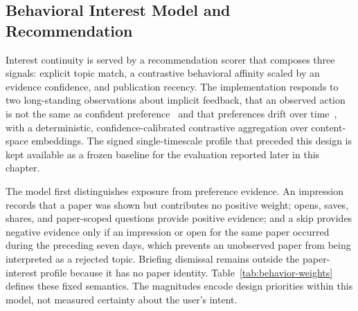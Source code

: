 \subsection{Behavioral Interest Model and Recommendation}
\label{subsec:backend-behavior}

Interest continuity is served by a recommendation scorer that composes three signals: explicit topic match, a contrastive behavioral affinity scaled by an evidence confidence, and publication recency.
The implementation responds to two long-standing observations about implicit feedback, that an observed action is not the same as confident preference~\cite{hu2008implicit} and that preferences drift over time~\cite{koren2009temporal}, with a deterministic, confidence-calibrated contrastive aggregation over content-space embeddings.
The signed single-timescale profile that preceded this design is kept available as a frozen baseline for the evaluation reported later in this chapter.

The model first distinguishes exposure from preference evidence.
An impression records that a paper was shown but contributes no positive weight; opens, saves, shares, and paper-scoped questions provide positive evidence; and a skip provides negative evidence only if an impression or open for the same paper occurred during the preceding seven days, which prevents an unobserved paper from being interpreted as a rejected topic.
Briefing dismissal remains outside the paper-interest profile because it has no paper identity.
Table~\ref{tab:behavior-weights} defines these fixed semantics. The magnitudes encode design priorities within this model, not measured certainty about the user's intent.

